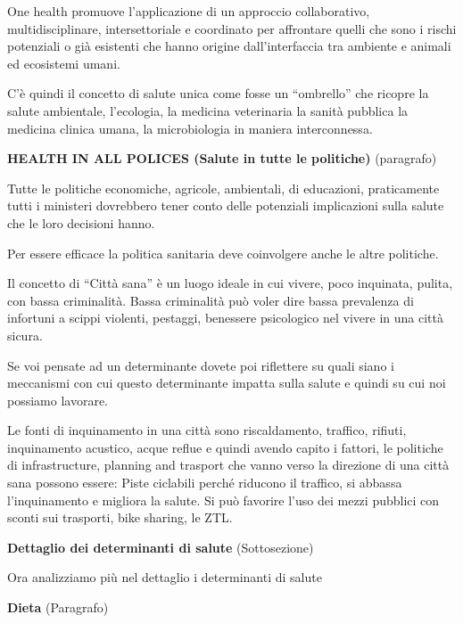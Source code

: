 \documentclass[]{article}
\begin{document}
One health promuove l'applicazione di un approccio collaborativo,
multidisciplinare, intersettoriale e coordinato per affrontare quelli
che sono i rischi potenziali o già esistenti che hanno origine
dall'interfaccia tra ambiente e animali ed ecosistemi umani.

C'è quindi il concetto di salute unica come fosse un ``ombrello'' che
ricopre la salute ambientale, l'ecologia, la medicina veterinaria la
sanità pubblica la medicina clinica umana, la microbiologia in maniera
interconnessa.

\textbf{HEALTH IN ALL POLICES (Salute in tutte le politiche)}
(paragrafo)

Tutte le politiche economiche, agricole, ambientali, di educazioni,
praticamente tutti i ministeri dovrebbero tener conto delle potenziali
implicazioni sulla salute che le loro decisioni hanno.

Per essere efficace la politica sanitaria deve coinvolgere anche le
altre politiche.

Il concetto di ``Città sana'' è un luogo ideale in cui vivere, poco
inquinata, pulita, con bassa criminalità. Bassa criminalità può voler
dire bassa prevalenza di infortuni a scippi violenti, pestaggi,
benessere psicologico nel vivere in una città sicura.

Se voi pensate ad un determinante dovete poi riflettere su quali siano i
meccanismi con cui questo determinante impatta sulla salute e quindi su
cui noi possiamo lavorare.

Le fonti di inquinamento in una città sono riscaldamento, traffico,
rifiuti, inquinamento acustico, acque reflue e quindi avendo capito i
fattori, le politiche di infrastructure, planning and trasport che vanno
verso la direzione di una città sana possono essere: Piste ciclabili
perché riducono il traffico, si abbassa l'inquinamento e migliora la
salute. Si può favorire l'uso dei mezzi pubblici con sconti sui
trasporti, bike sharing, le ZTL.

\textbf{Dettaglio dei determinanti di salute} (Sottosezione)

Ora analizziamo più nel dettaglio i determinanti di salute

\textbf{Dieta} (Paragrafo)
\end{document}

